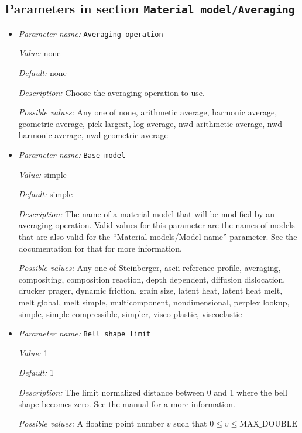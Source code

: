 \subsection{Parameters in section \tt Material model/Averaging}
\label{parameters:Material_20model/Averaging}

\begin{itemize}
\item {\it Parameter name:} {\tt Averaging operation}
\label{parameters:Material model/Averaging/Averaging operation}


{\it Value:} none


{\it Default:} none


{\it Description:} Choose the averaging operation to use.


{\it Possible values:} Any one of none, arithmetic average, harmonic average, geometric average, pick largest, log average, nwd arithmetic average, nwd harmonic average, nwd geometric average
\item {\it Parameter name:} {\tt Base model}
\label{parameters:Material model/Averaging/Base model}


{\it Value:} simple


{\it Default:} simple


{\it Description:} The name of a material model that will be modified by an averaging operation. Valid values for this parameter are the names of models that are also valid for the ``Material models/Model name'' parameter. See the documentation for that for more information.


{\it Possible values:} Any one of Steinberger, ascii reference profile, averaging, compositing, composition reaction, depth dependent, diffusion dislocation, drucker prager, dynamic friction, grain size, latent heat, latent heat melt, melt global, melt simple, multicomponent, nondimensional, perplex lookup, simple, simple compressible, simpler, visco plastic, viscoelastic
\item {\it Parameter name:} {\tt Bell shape limit}
\label{parameters:Material model/Averaging/Bell shape limit}


{\it Value:} 1


{\it Default:} 1


{\it Description:} The limit normalized distance between 0 and 1 where the bell shape becomes zero. See the manual for a more information.


{\it Possible values:} A floating point number $v$ such that $0 \leq v \leq \text{MAX\_DOUBLE}$
\end{itemize}

